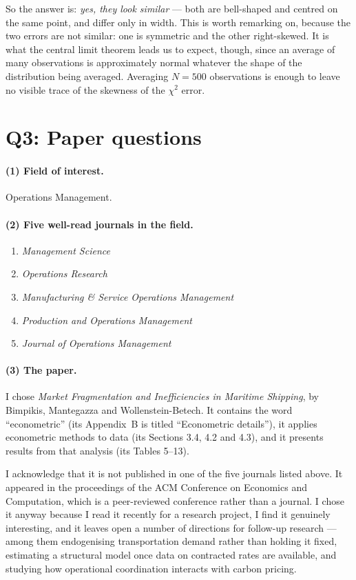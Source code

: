 \documentclass[11pt]{article}
\begin{document}
So the answer is: \emph{yes, they look similar} --- both are bell-shaped and
centred on the same point, and differ only in width. This is worth remarking on,
because the two errors are not similar: one is symmetric and the other
right-skewed. It is what the central limit theorem leads us to expect, though,
since an average of many observations is approximately normal whatever the shape
of the distribution being averaged. Averaging $N = 500$ observations is enough
to leave no visible trace of the skewness of the $\chi^2$ error.

\section{Q3: Paper questions}

\paragraph{(1) Field of interest.}
Operations Management.

\paragraph{(2) Five well-read journals in the field.}
\begin{enumerate}
\item \emph{Management Science}
\item \emph{Operations Research}
\item \emph{Manufacturing \& Service Operations Management}
\item \emph{Production and Operations Management}
\item \emph{Journal of Operations Management}
\end{enumerate}

\paragraph{(3) The paper.}
I chose \emph{Market Fragmentation and Inefficiencies in Maritime Shipping},
by Bimpikis, Mantegazza and Wollenstein-Betech. It contains the word
``econometric'' (its Appendix~B is titled ``Econometric details''), it applies
econometric methods to data (its Sections 3.4, 4.2 and 4.3), and it presents
results from that analysis (its Tables 5--13).

I acknowledge that it is not published in one of the five journals listed
above. It appeared in the proceedings of the ACM Conference on Economics and
Computation, which is a peer-reviewed conference rather than a journal. I chose
it anyway because I read it recently for a research project, I find it genuinely
interesting, and it leaves open a number of directions for follow-up research
--- among them endogenising transportation demand rather than holding it fixed,
estimating a structural model once data on contracted rates are available, and
studying how operational coordination interacts with carbon pricing.
\end{document}
